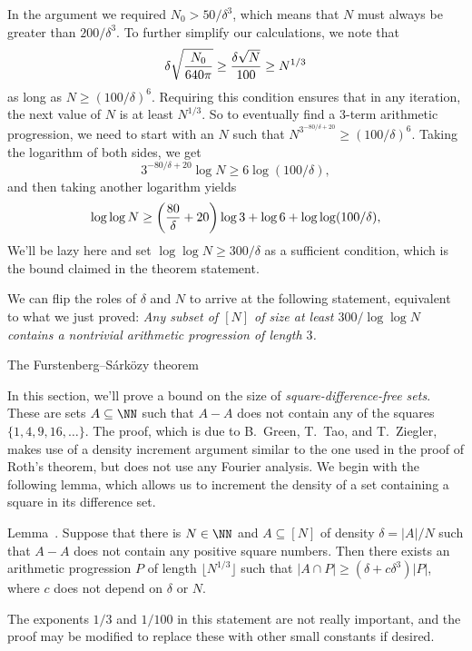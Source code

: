 In the argument we required $N_0 > 50/\delta^3$, which means that $N$ must always be greater than
$200/\delta^3$. To further simplify our calculations, we note that
$$\delta \sqrt{N_0\over 640\pi } \ge {\delta\sqrt N\over 100} \ge N^{1/3}$$
as long as $N\ge (100/\delta)^6$. Requiring this condition ensures that in any iteration, the next
value of $N$ is at least $N^{1/3}$. So to eventually find a $3$-term arithmetic
progression, we need to start with an $N$ such that $N^{3^{-80/\delta+20}} \ge (100/\delta)^6$.
Taking the logarithm of both sides, we get
$$ 3^{-80/\delta+20} \log N \ge 6\log(100/\delta),$$
and then taking another logarithm yields
$$ \log\log N \ge \biggl({80\over\delta} + 20\biggr)\log 3 +\log 6 + \log\log(100/\delta),$$
We'll be lazy here and set $\log\log N\ge 300/\delta$ as
a sufficient condition, which is the bound claimed in the theorem statement.\slug

We can flip the roles of $\delta$ and $N$ to arrive at the following statement,
equivalent to what we just proved: {\sl Any subset of $[N]$
of size at least $300/\log\log N$ contains a nontrivial arithmetic progression of length $3$.}

\advsect The Furstenberg--S\'ark\"ozy theorem

In this section, we'll prove a bound on the size of {\it square-difference-free sets}. These are sets
$A\subseteq \NN$ such that $A-A$ does not contain any of the squares $\{1,4,9,16,\ldots\}$.
The proof, which is due to B.~Green, T.~Tao, and T.~Ziegler,
makes use of a density increment argument similar to the one used in the proof of
Roth's theorem, but does not use any Fourier analysis. We begin with the following lemma, which allows
us to increment the density of a set containing a square in its difference set.

\proclaim Lemma~\advthm.
Suppose that there is $N\in \NN$ and $A\subseteq [N]$ of density $\delta = |A|/N$ such that
$A-A$ does not contain any positive square numbers. Then there exists an arithmetic progression
$P$ of length $\lfloor N^{1/3}\rfloor$
such that $|A\cap P| \ge (\delta + c\delta^3)|P|$, where $c$ does not depend on $\delta$ or $N$.

The exponents $1/3$ and $1/100$ in this statement are not really important, and the proof
may be modified to replace these with other small constants if desired.

